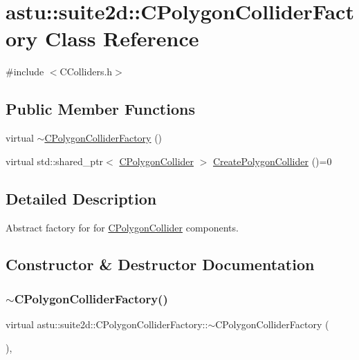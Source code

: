 \hypertarget{classastu_1_1suite2d_1_1CPolygonColliderFactory}{}\section{astu\+:\+:suite2d\+:\+:C\+Polygon\+Collider\+Factory Class Reference}
\label{classastu_1_1suite2d_1_1CPolygonColliderFactory}


{\ttfamily \#include $<$C\+Colliders.\+h$>$}

\subsection*{Public Member Functions}
\begin{DoxyCompactItemize}
\item 
virtual \hyperlink{classastu_1_1suite2d_1_1CPolygonColliderFactory_ad8db117ac2def0fd39b77c718cc875bc}{$\sim$\+C\+Polygon\+Collider\+Factory} ()
\item 
virtual std\+::shared\+\_\+ptr$<$ \hyperlink{classastu_1_1suite2d_1_1CPolygonCollider}{C\+Polygon\+Collider} $>$ \hyperlink{classastu_1_1suite2d_1_1CPolygonColliderFactory_a29ecb824aa282ce5c6d64111d9bfd65f}{Create\+Polygon\+Collider} ()=0
\end{DoxyCompactItemize}


\subsection{Detailed Description}
Abstract factory for for \hyperlink{classastu_1_1suite2d_1_1CPolygonCollider}{C\+Polygon\+Collider} components. 

\subsection{Constructor \& Destructor Documentation}
\mbox{\label{classastu_1_1suite2d_1_1CPolygonColliderFactory_ad8db117ac2def0fd39b77c718cc875bc}} 
\subsubsection{\texorpdfstring{$\sim$\+C\+Polygon\+Collider\+Factory()}{~CPolygonColliderFactory()}}
{\footnotesize\ttfamily virtual astu\+::suite2d\+::\+C\+Polygon\+Collider\+Factory\+::$\sim$\+C\+Polygon\+Collider\+Factory (\begin{DoxyParamCaption}{ }\end{DoxyParamCaption})\hspace{0.3cm}{\ttfamily [inline]}, {\ttfamily [virtual]}}

